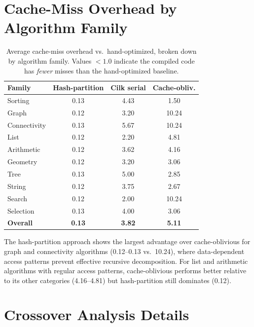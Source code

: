 \documentclass[11pt]{article}
\begin{document}
\section{Cache-Miss Overhead by Algorithm Family}
\label{app:perfamily}

\begin{table}[h]
\centering
\caption{Average cache-miss overhead vs.\ hand-optimized, broken down by
  algorithm family.  Values $< 1.0$ indicate the compiled code has
  \emph{fewer} misses than the hand-optimized baseline.}
\label{tab:perfamily}
\begin{tabular}{@{}lccc@{}}
\toprule
\textbf{Family} & \textbf{Hash-partition} & \textbf{Cilk serial} & \textbf{Cache-obliv.} \\
\midrule
Sorting & 0.13 & 4.43 & 1.50 \\
Graph & 0.12 & 3.20 & 10.24 \\
Connectivity & 0.13 & 5.67 & 10.24 \\
List & 0.12 & 2.20 & 4.81 \\
Arithmetic & 0.12 & 3.62 & 4.16 \\
Geometry & 0.12 & 3.20 & 3.06 \\
Tree & 0.13 & 5.00 & 2.85 \\
String & 0.12 & 3.75 & 2.67 \\
Search & 0.12 & 2.00 & 10.24 \\
Selection & 0.13 & 4.00 & 3.06 \\
\midrule
\textbf{Overall} & \textbf{0.13} & \textbf{3.82} & \textbf{5.11} \\
\bottomrule
\end{tabular}
\end{table}

The hash-partition approach shows the largest advantage over cache-oblivious
for graph and connectivity algorithms (0.12--0.13 vs.\ 10.24), where data-dependent access patterns
prevent effective recursive decomposition.  For list and arithmetic
algorithms with regular access patterns, cache-oblivious performs better
relative to its other categories (4.16--4.81) but hash-partition still dominates (0.12).

\section{Crossover Analysis Details}
\label{app:crossover}
\end{document}
